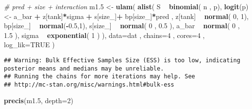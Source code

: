 \documentclass[
]{article}
\newenvironment{Shaded}{\begin{snugshade}}{\end{snugshade}}
\newcommand{\CommentTok}[1]{\textcolor[rgb]{0.56,0.35,0.01}{\textit{#1}}}
\newcommand{\DataTypeTok}[1]{\textcolor[rgb]{0.13,0.29,0.53}{#1}}
\newcommand{\DecValTok}[1]{\textcolor[rgb]{0.00,0.00,0.81}{#1}}
\newcommand{\FloatTok}[1]{\textcolor[rgb]{0.00,0.00,0.81}{#1}}
\newcommand{\KeywordTok}[1]{\textcolor[rgb]{0.13,0.29,0.53}{\textbf{#1}}}
\newcommand{\NormalTok}[1]{#1}
\newcommand{\OperatorTok}[1]{\textcolor[rgb]{0.81,0.36,0.00}{\textbf{#1}}}
\newcommand{\OtherTok}[1]{\textcolor[rgb]{0.56,0.35,0.01}{#1}}
\newcommand{\StringTok}[1]{\textcolor[rgb]{0.31,0.60,0.02}{#1}}
\begin{document}
\begin{Shaded}
\begin{Highlighting}[]
\CommentTok{# pred + size + interaction }
\NormalTok{m1}\FloatTok{.5}\NormalTok{ <-}\StringTok{ }\KeywordTok{ulam}\NormalTok{(}
\KeywordTok{alist}\NormalTok{(}
\NormalTok{S }\OperatorTok{~}\StringTok{ }\KeywordTok{binomial}\NormalTok{( n , p),}
\KeywordTok{logit}\NormalTok{(p) <-}\StringTok{ }\NormalTok{a_bar }\OperatorTok{+}\StringTok{ }\NormalTok{z[tank]}\OperatorTok{*}\NormalTok{sigma }\OperatorTok{+}\StringTok{ }\NormalTok{s[size_]}\OperatorTok{+}\StringTok{ }\NormalTok{bp[size_]}\OperatorTok{*}\NormalTok{pred , }
\NormalTok{z[tank] }\OperatorTok{~}\StringTok{ }\KeywordTok{normal}\NormalTok{( }\DecValTok{0}\NormalTok{, }\DecValTok{1}\NormalTok{), }
\NormalTok{bp[size_] }\OperatorTok{~}\StringTok{ }\KeywordTok{normal}\NormalTok{(}\OperatorTok{-}\FloatTok{0.5}\NormalTok{,}\DecValTok{1}\NormalTok{), }
\NormalTok{s[size_] }\OperatorTok{~}\StringTok{ }\KeywordTok{normal}\NormalTok{( }\DecValTok{0}\NormalTok{ , }\FloatTok{0.5}\NormalTok{ ), }
\NormalTok{a_bar }\OperatorTok{~}\StringTok{ }\KeywordTok{normal}\NormalTok{( }\DecValTok{0}\NormalTok{ , }\FloatTok{1.5}\NormalTok{ ), }
\NormalTok{sigma }\OperatorTok{~}\StringTok{ }\KeywordTok{exponential}\NormalTok{( }\DecValTok{1}\NormalTok{ )}
\NormalTok{), }\DataTypeTok{data=}\NormalTok{dat , }\DataTypeTok{chains=}\DecValTok{4}\NormalTok{ , }\DataTypeTok{cores=}\DecValTok{4}\NormalTok{ , }\DataTypeTok{log_lik=}\OtherTok{TRUE}\NormalTok{ )}
\end{Highlighting}
\end{Shaded}

\begin{verbatim}
## Warning: Bulk Effective Samples Size (ESS) is too low, indicating posterior means and medians may be unreliable.
## Running the chains for more iterations may help. See
## http://mc-stan.org/misc/warnings.html#bulk-ess
\end{verbatim}

\begin{Shaded}
\begin{Highlighting}[]
\KeywordTok{precis}\NormalTok{(m1}\FloatTok{.5}\NormalTok{, }\DataTypeTok{depth=}\DecValTok{2}\NormalTok{)}
\end{Highlighting}
\end{Shaded}
\end{document}
